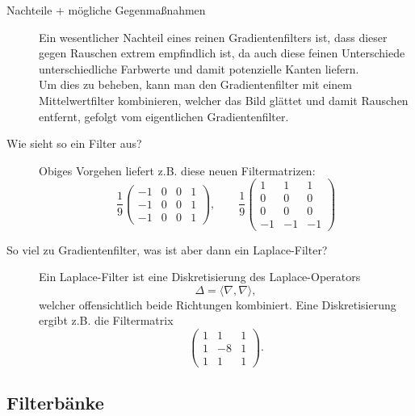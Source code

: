 \begin{description}
$$       $$
	\item[Nachteile + mögliche Gegenmaßnahmen]
      Ein wesentlicher Nachteil eines reinen Gradientenfilters ist, dass dieser gegen Rauschen extrem empfindlich ist, da
      auch diese feinen Unterschiede unterschiedliche Farbwerte und damit potenzielle Kanten liefern.\\
      Um dies zu beheben, kann man den Gradientenfilter mit einem Mittelwertfilter kombinieren, welcher das Bild glättet 
      und damit Rauschen entfernt, gefolgt vom eigentlichen Gradientenfilter.\\
	\item[Wie sieht so ein Filter aus?]
      Obiges Vorgehen liefert z.B. diese neuen Filtermatrizen:
      $$ \frac{1}{9}\begin{pmatrix}-1&0&0&1\\-1&0&0&1\\-1&0&0&1\end{pmatrix},\qquad \frac{1}{9}\begin{pmatrix}1&1&1\\0&0&0\\0&0&0\\-1&-1&-1\end{pmatrix}$$
    \item[So viel zu Gradientenfilter, was ist aber dann ein Laplace-Filter?]
      Ein Laplace-Filter ist eine Diskretisierung des Laplace-Operators
      $$ \Delta = \langle \nabla, \nabla \rangle, $$
      welcher offensichtlich beide Richtungen kombiniert. Eine Diskretisierung ergibt z.B. die Filtermatrix
      $$ \begin{pmatrix} 1&1&1\\1&-8&1\\1&1&1 \end{pmatrix}.$$
\end{description}

\newpage
\subsection{Filterbänke}

